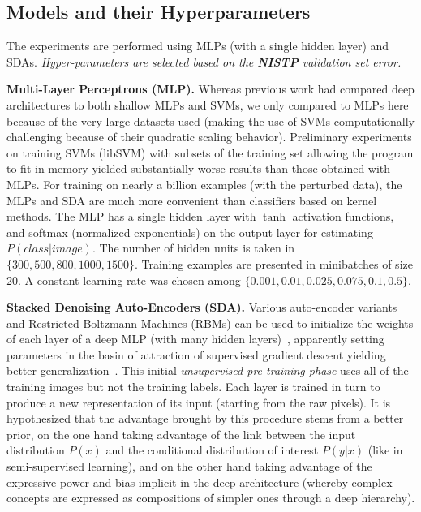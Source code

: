 \documentclass{article} %
\begin{document}
\vspace*{-3mm}
\subsection{Models and their Hyperparameters}
\vspace*{-2mm}

The experiments are performed using MLPs (with a single
hidden layer) and SDAs.
\emph{Hyper-parameters are selected based on the {\bf NISTP} validation set error.}

{\bf Multi-Layer Perceptrons (MLP).}
Whereas previous work had compared deep architectures to both shallow MLPs and
SVMs, we only compared to MLPs here because of the very large datasets used
(making the use of SVMs computationally challenging because of their quadratic
scaling behavior). Preliminary experiments on training SVMs (libSVM) with subsets of the training
set allowing the program to fit in memory yielded substantially worse results
than those obtained with MLPs. For training on nearly a billion examples
(with the perturbed data), the MLPs and SDA are much more convenient than
classifiers based on kernel methods.
The MLP has a single hidden layer with $\tanh$ activation functions, and softmax (normalized
exponentials) on the output layer for estimating $P(class | image)$.
The number of hidden units is taken in $\{300,500,800,1000,1500\}$. 
Training examples are presented in minibatches of size 20. A constant learning
rate was chosen among $\{0.001, 0.01, 0.025, 0.075, 0.1, 0.5\}$.
\vspace*{-1mm}


{\bf Stacked Denoising Auto-Encoders (SDA).}
Various auto-encoder variants and Restricted Boltzmann Machines (RBMs)
can be used to initialize the weights of each layer of a deep MLP (with many hidden 
layers)~\citep{Hinton06,ranzato-07-small,Bengio-nips-2006}, 
apparently setting parameters in the
basin of attraction of supervised gradient descent yielding better 
generalization~\citep{Erhan+al-2010}.  This initial {\em unsupervised
pre-training phase} uses all of the training images but not the training labels.
Each layer is trained in turn to produce a new representation of its input
(starting from the raw pixels).
It is hypothesized that the
advantage brought by this procedure stems from a better prior,
on the one hand taking advantage of the link between the input
distribution $P(x)$ and the conditional distribution of interest
$P(y|x)$ (like in semi-supervised learning), and on the other hand
taking advantage of the expressive power and bias implicit in the
deep architecture (whereby complex concepts are expressed as
compositions of simpler ones through a deep hierarchy).
\end{document}
